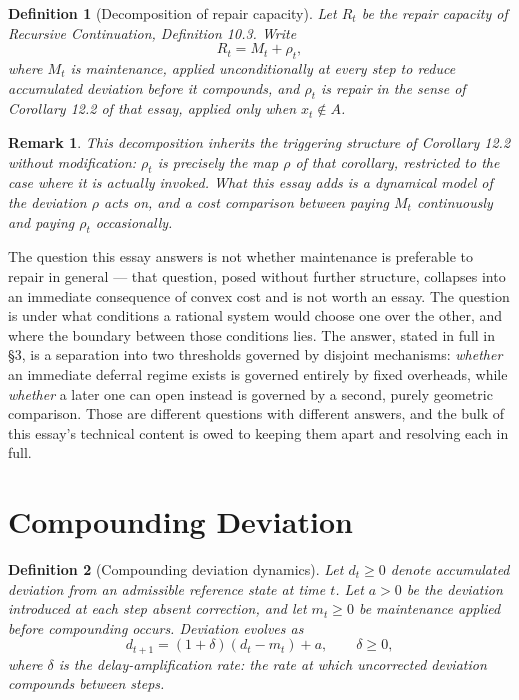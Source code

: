 \documentclass[11pt]{article}
\newtheorem{definition}{Definition}[section]
\newtheorem*{remark}{Remark}
\begin{document}
\begin{definition}[Decomposition of repair capacity]
Let $R_t$ be the repair capacity of \emph{Recursive Continuation}, Definition 10.3. Write
\[
R_t = M_t + \rho_t,
\]
where $M_t$ is \emph{maintenance}, applied unconditionally at every step to reduce accumulated deviation before it compounds, and $\rho_t$ is \emph{repair} in the sense of Corollary 12.2 of that essay, applied only when $x_t \notin A$.
\end{definition}

\begin{remark}
This decomposition inherits the triggering structure of Corollary 12.2 without modification: $\rho_t$ is precisely the map $\rho$ of that corollary, restricted to the case where it is actually invoked. What this essay adds is a dynamical model of the deviation $\rho$ acts on, and a cost comparison between paying $M_t$ continuously and paying $\rho_t$ occasionally.
\end{remark}

The question this essay answers is not whether maintenance is preferable to repair in general — that question, posed without further structure, collapses into an immediate consequence of convex cost and is not worth an essay. The question is under what conditions a rational system would choose one over the other, and where the boundary between those conditions lies. The answer, stated in full in \S 3, is a separation into two thresholds governed by disjoint mechanisms: \emph{whether} an immediate deferral regime exists is governed entirely by fixed overheads, while \emph{whether} a later one can open instead is governed by a second, purely geometric comparison. Those are different questions with different answers, and the bulk of this essay's technical content is owed to keeping them apart and resolving each in full.

\section{Compounding Deviation}

\begin{definition}[Compounding deviation dynamics]
Let $d_t \geq 0$ denote accumulated deviation from an admissible reference state at time $t$. Let $a > 0$ be the deviation introduced at each step absent correction, and let $m_t \geq 0$ be maintenance applied before compounding occurs. Deviation evolves as
\[
d_{t+1} = (1+\delta)(d_t - m_t) + a, \qquad \delta \geq 0,
\]
where $\delta$ is the \emph{delay-amplification rate}: the rate at which uncorrected deviation compounds between steps.
\end{definition}
\end{document}
